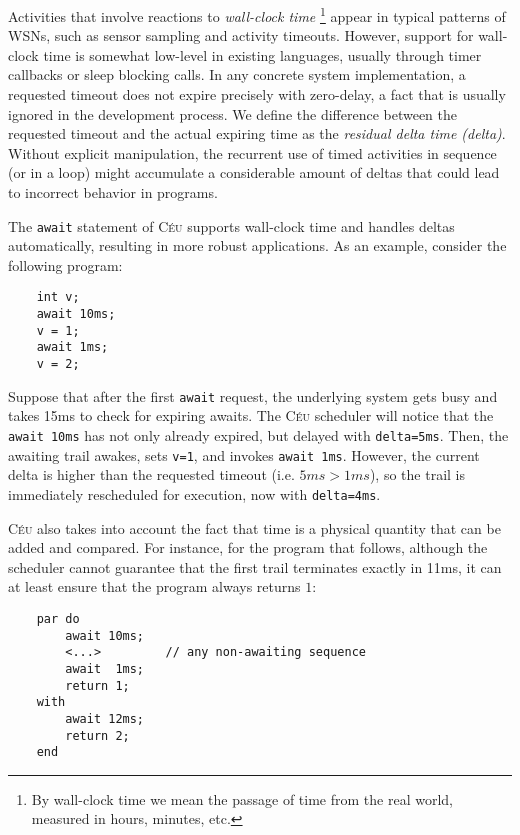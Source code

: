 \documentclass[10pt]{sensys-proc}
\newcommand{\CEU}{\textsc{C\'{e}u}\xspace}
\newcommand{\code}[1] {{\small{\texttt{#1}}}}
\begin{document}
Activities that involve reactions to \emph{wall-clock time}%
\footnote{
By wall-clock time we mean the passage of time from the real world, measured in 
hours, minutes, etc.
}
appear in typical patterns of WSNs, such as sensor sampling and activity 
timeouts.
However, support for wall-clock time is somewhat low-level in existing 
languages, usually through timer callbacks or sleep blocking calls.
%
In any concrete system implementation, a requested timeout does not expire 
precisely with zero-delay, a fact that is usually ignored in the development 
process.
We define the difference between the requested timeout and the actual expiring 
time as the \emph{residual delta time (delta)}.
Without explicit manipulation, the recurrent use of timed activities in 
sequence (or in a loop) might accumulate a considerable amount of deltas that 
could lead to incorrect behavior in programs.

The \code{await} statement of \CEU supports wall-clock time and handles deltas 
automatically, resulting in more robust applications.
As an example, consider the following program:

{\small
\begin{verbatim}
    int v;
    await 10ms;
    v = 1;
    await 1ms;
    v = 2;
\end{verbatim}
}

Suppose that after the first \code{await} request, the underlying system gets 
busy and takes 15ms to check for expiring awaits.
The \CEU scheduler will notice that the \code{await 10ms} has not only already 
expired, but delayed with \code{delta=5ms}.
Then, the awaiting trail awakes, sets \code{v=1}, and invokes \code{await 1ms}.
However, the current delta is higher than the requested timeout (i.e. $5ms > 
1ms$), so the trail is immediately rescheduled for execution, now with 
\code{delta=4ms}.

\CEU also takes into account the fact that time is a physical quantity that can 
be added and compared.
For instance, for the program that follows, although the scheduler cannot 
guarantee that the first trail terminates exactly in 11ms, it can at least 
ensure that the program always returns $1$:

{\small
\begin{verbatim}
    par do
        await 10ms;
        <...>         // any non-awaiting sequence
        await  1ms;
        return 1;
    with
        await 12ms;
        return 2;
    end
\end{verbatim}
}
\end{document}

